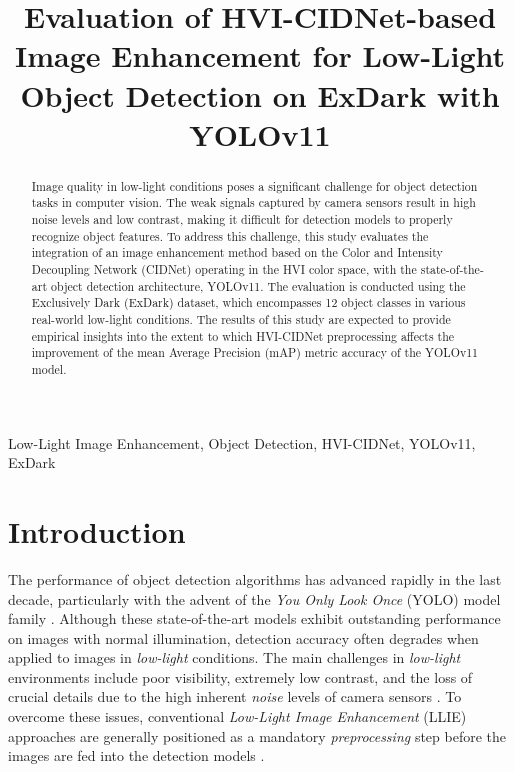 \documentclass[conference]{IEEEtran}
\begin{document}
\title{Evaluation of HVI-CIDNet-based Image Enhancement for Low-Light Object Detection on ExDark with YOLOv11}

\author{
}

\maketitle

\begin{abstract}
Image quality in low-light conditions poses a significant challenge for object detection tasks in computer vision. The weak signals captured by camera sensors result in high noise levels and low contrast, making it difficult for detection models to properly recognize object features. To address this challenge, this study evaluates the integration of an image enhancement method based on the Color and Intensity Decoupling Network (CIDNet) operating in the HVI color space, with the state-of-the-art object detection architecture, YOLOv11. The evaluation is conducted using the Exclusively Dark (ExDark) dataset, which encompasses 12 object classes in various real-world low-light conditions. The results of this study are expected to provide empirical insights into the extent to which HVI-CIDNet preprocessing affects the improvement of the mean Average Precision (mAP) metric accuracy of the YOLOv11 model.
\end{abstract}

\begin{IEEEkeywords}
Low-Light Image Enhancement, Object Detection, HVI-CIDNet, YOLOv11, ExDark
\end{IEEEkeywords}

\section{Introduction}
The performance of object detection algorithms has advanced rapidly in the last decade, particularly with the advent of the \textit{You Only Look Once} (YOLO) model family \cite{terven2023yoloreview}. Although these state-of-the-art models exhibit outstanding performance on images with normal illumination, detection accuracy often degrades when applied to images in \textit{low-light} conditions. The main challenges in \textit{low-light} environments include poor visibility, extremely low contrast, and the loss of crucial details due to the high inherent \textit{noise} levels of camera sensors \cite{loh2019exdark}. To overcome these issues, conventional \textit{Low-Light Image Enhancement} (LLIE) approaches are generally positioned as a mandatory \textit{preprocessing} step before the images are fed into the detection models \cite{liu2021benchmark}.
\end{document}
